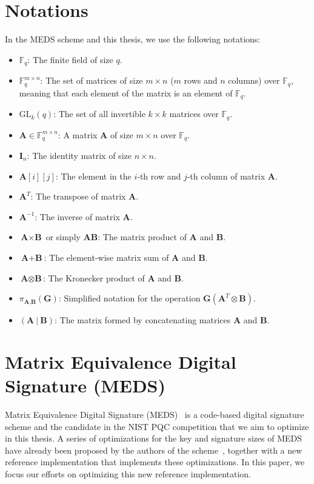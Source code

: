 \documentclass[11pt,a4paper]{report}
\theoremstyle{definition}
\begin{document}
\section{Notations}
\label{sec:notations}
In the MEDS scheme and this thesis, we use the following notations:
\begin{itemize}
  \item $\mathbb{F}_q$: The finite field of size $q$.
  \item $\mathbb{F}_q^{m \times n}$: The set of matrices of size $m \times n$ ($m$ rows and $n$ columns) over $\mathbb{F}_q$, meaning that each element of the matrix is an element of $\mathbb{F}_q$.
  \item $\text{GL}_k(q)$: The set of all invertible $k \times k$ matrices over $\mathds{F}_q$.
  \item $\textbf{A} \in \mathbb{F}_q^{m \times n}$: A matrix $\textbf{A}$ of size $m \times n$ over $\mathbb{F}_q$.
  \item $\textbf{I}_n$: The identity matrix of size $n \times n$.
  \item $\textbf{A}[i][j]$: The element in the $i$-th row and $j$-th column of matrix $\textbf{A}$.
  \item $\textbf{A}^T$: The transpose of matrix $\textbf{A}$.
  \item $\textbf{A}^{-1}$: The inverse of matrix $\textbf{A}$.
  \item $\textbf{A} \times \textbf{B}$ or simply $\textbf{AB}$: The matrix product of $\textbf{A}$ and $\textbf{B}$.
  \item $\textbf{A} + \textbf{B}$: The element-wise matrix sum of $\textbf{A}$ and $\textbf{B}$.
  \item $\textbf{A} \otimes \textbf{B}$: The Kronecker product of $\textbf{A}$ and $\textbf{B}$.
  \item $\pi_{\textbf{A}, \textbf{B}}(\textbf{G})$: Simplified notation for the operation $\textbf{G}(\textbf{A}^T \otimes \textbf{B})$.
  \item $(\textbf{A}~|~\textbf{B})$: The matrix formed by concatenating matrices $\textbf{A}$ and $\textbf{B}$.
\end{itemize}

\section{Matrix Equivalence Digital Signature (MEDS)}
\label{sec:meds}
Matrix Equivalence Digital Signature (MEDS)~\cite{chou2023take} is a code-based digital signature scheme and the candidate in the NIST PQC competition that we aim to optimize in this thesis. A series of optimizations for the key and signature sizes of MEDS have already been proposed by the authors of the scheme~\cite{chou2024reducing}, together with a new reference implementation that implements these optimizations. In this paper, we focus our efforts on optimizing this new reference implementation.
\end{document}
